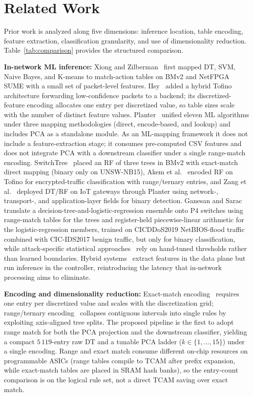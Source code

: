 \documentclass[runningheads]{llncs}
\begin{document}
\section{Related Work}\label{sec:related}
Prior work is analyzed along five dimensions: inference location, table encoding, feature extraction, classification granularity, and use of dimensionality reduction. Table~\ref{tab:comparison} provides the structured comparison.

\textbf{In-network ML inference:} Xiong and Zilberman~\cite{Xiong201925} first mapped DT, SVM, Naive Bayes, and K-means to match-action tables on BMv2 and NetFPGA SUME with a small set of packet-level features. IIsy~\cite{Zheng20242555} added a hybrid Tofino architecture forwarding low-confidence packets to a backend; its discretized-feature encoding allocates one entry per discretized value, so table sizes scale with the number of distinct feature values. Planter~\cite{Zheng20242} unified eleven ML algorithms under three mapping methodologies (direct, encode-based, and lookup) and includes PCA as a standalone module. As an ML-mapping framework it does not include a feature-extraction stage; it consumes pre-computed CSV features and does not integrate PCA with a downstream classifier under a single range-match encoding. SwitchTree~\cite{Lee202523143} placed an RF of three trees in BMv2 with exact-match direct mapping (binary only on UNSW-NB15), Akem et al.~\cite{Akem2024} encoded RF on Tofino for encrypted-traffic classification with range/ternary entries, and Zang et al.~\cite{Zang20249244} deployed DT/RF on IoT gateways through Planter using network-, transport-, and application-layer fields for binary detection. Ganesan and Sarac~\cite{Ganesan2025} translate a decision-tree-and-logistic-regression ensemble onto P4 switches using range-match tables for the trees and register-held piecewise-linear arithmetic for the logistic-regression members, trained on CICDDoS2019 NetBIOS-flood traffic combined with CIC-IDS2017 benign traffic, but only for binary classification, while attack-specific statistical approaches~\cite{Ilha20213121,Wang20241480,Li2024} rely on hand-tuned thresholds rather than learned boundaries. Hybrid systems~\cite{El-Sayed2025,Musumeci2022,Doriguzzi-Corin2024} extract features in the data plane but run inference in the controller, reintroducing the latency that in-network processing aims to eliminate.

\textbf{Encoding and dimensionality reduction:} Exact-match encoding~\cite{Lee202523143,Zheng20242} requires one entry per discretized value and scales with the discretization grid; range/ternary encoding~\cite{Akem2024,Ganesan2025,Zheng20242} collapses contiguous intervals into single rules by exploiting axis-aligned tree splits. The proposed pipeline is the first to adopt range match for both the PCA projection and the downstream classifier, yielding a compact $5\,119$-entry raw DT and a tunable PCA ladder ($k\!\in\!\{1,\dots,15\}$) under a single encoding. Range and exact match consume different on-chip resources on programmable ASICs (range tables compile to TCAM after prefix expansion, while exact-match tables are placed in SRAM hash banks), so the entry-count comparison is on the logical rule set, not a direct TCAM saving over exact match.
\end{document}
